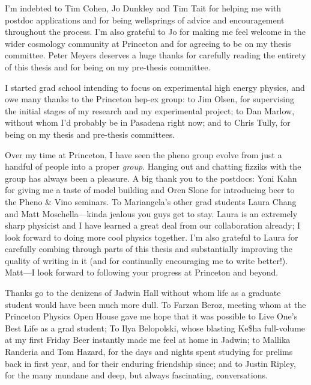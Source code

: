 I'm indebted to Tim Cohen, Jo Dunkley and Tim Tait for helping me with postdoc applications and for being wellsprings of advice and encouragement throughout the process. I'm also grateful to Jo for making me feel welcome in the wider cosmology community at Princeton and for agreeing to be on my thesis committee. Peter Meyers deserves a huge thanks for carefully reading the entirety of this thesis and for being on my pre-thesis committee. 

I started grad school intending to focus on experimental high energy physics, and owe many thanks to the Princeton hep-ex group: to Jim Olsen, for supervising the initial stages of my research and my experimental project; to Dan Marlow, without whom I'd probably be in Pasadena right now; and to Chris Tully, for being on my thesis and pre-thesis committees. 

Over my time at Princeton, I have seen the pheno group evolve from just a handful of people into a proper \emph{group}. Hanging out and chatting fizziks with the group has always been a pleasure. A big thank you to the postdocs: Yoni Kahn for giving me a taste of model building and Oren Slone for introducing beer to the Pheno \& Vino seminars. To Mariangela's other grad students Laura Chang and Matt Moschella---kinda jealous you guys get to stay. Laura is an extremely sharp physicist and I have learned a great deal from our collaboration already; I look forward to doing more cool physics together. I'm also grateful to Laura for carefully combing through parts of this thesis and substantially improving the quality of writing in it (and for continually encouraging me to write better!). Matt---I look forward to following your progress at Princeton and beyond.

Thanks go to the denizens of Jadwin Hall without whom life as a graduate student would have been much more dull. To Farzan Beroz, meeting whom at the Princeton Physics Open House gave me hope that it was possible to Live One's Best Life as a grad student; To Ilya Belopolski, whose blasting Ke\$ha full-volume at my first Friday Beer instantly made me feel at home in Jadwin; to Mallika Randeria and Tom Hazard, for the days and nights spent studying for prelims back in first year, and for their enduring friendship since; and to Justin Ripley, for the many mundane and deep, but always fascinating, conversations. %

